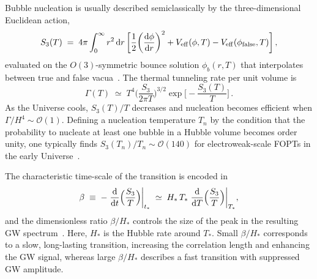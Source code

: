 \documentclass[a4paper,11pt]{article}
\begin{document}
Bubble nucleation is usually described semiclassically by the three-dimensional Euclidean action,
\begin{equation}
  S_3(T) \;=\; 4\pi \int_0^\infty r^2 \,{\rm d}r\,
  \bigg[\frac{1}{2}\bigg(\frac{{\rm d}\phi}{{\rm d}r}\bigg)^2
  + V_{\rm eff}(\phi,T) - V_{\rm eff}(\phi_{\rm false},T)\bigg]\,,
\end{equation}
evaluated on the $O(3)$-symmetric bounce solution $\phi_b(r,T)$ that interpolates between true and false
vacua~\citep{Coleman:1977py,Callan:1977pt,Linde:1981zj}. The thermal tunneling rate per unit volume is
\begin{equation}
  \Gamma(T) \;\simeq\;
  T^4 \bigg(\frac{S_3}{2\pi T}\bigg)^{3/2}
  \exp\!\bigg[-\frac{S_3(T)}{T}\bigg]\,.
\end{equation}
As the Universe cools, $S_3(T)/T$ decreases and nucleation becomes efficient when $\Gamma/H^4 \sim \mathcal{O}(1)$. 
Defining a nucleation temperature $T_n$ by the condition that the probability to nucleate at least one bubble 
in a Hubble volume becomes order unity, one typically finds $S_3(T_n)/T_n \sim \mathcal{O}(140)$ for 
electroweak-scale FOPTs in the early Universe~\citep{Linde:1981zj,Quiros:1999jp}.

The characteristic time-scale of the transition is encoded in
\begin{equation}
  \beta \;\equiv\; -\left.\frac{{\rm d}}{{\rm d}t}\Big(\frac{S_3}{T}\Big)\right|_{t_*}
  \;\simeq\; H_*\, T_* \left.\frac{{\rm d}}{{\rm d}T}\Big(\frac{S_3}{T}\Big)\right|_{T_*}\!,
\end{equation}
and the dimensionless ratio $\beta/H_*$ controls the size of the peak in the resulting GW
spectrum~\citep{Turner:1992tz,Kamionkowski:1993fg,Caprini:2019egz}. Here, $H_*$ is the Hubble 
rate around $T_*$. Small $\beta/H_*$ corresponds to a slow, long-lasting transition, 
increasing the correlation length and enhancing the GW signal, whereas large $\beta/H_*$ 
describes a fast transition with suppressed GW amplitude.
\end{document}
